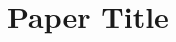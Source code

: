 \documentclass[12pt]{article}
\title{\papertitle}
\newcommand{\papertitle}{Paper Title}
\begin{document}

\section{\papertitle}
\end{document}
